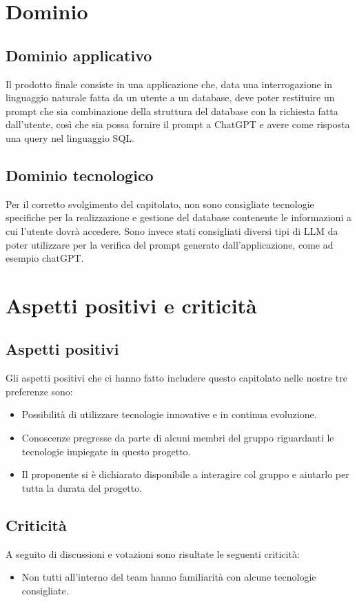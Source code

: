 \documentclass[12pt]{report}
\begin{document}
\section{Dominio}
\subsection{Dominio applicativo}
Il prodotto finale consiste in una applicazione che, data una interrogazione in linguaggio naturale fatta da un utente a un database, deve poter restituire un prompt che sia combinazione della struttura del database con la richiesta fatta dall’utente, così che sia possa fornire il prompt a ChatGPT e avere come risposta una query nel linguaggio SQL.

\subsection{Dominio tecnologico}
Per il corretto svolgimento del capitolato, non sono consigliate tecnologie specifiche per la realizzazione e gestione del database contenente le informazioni a cui l'utente dovrà accedere.
Sono invece stati consigliati diversi tipi di LLM da poter utilizzare per la verifica del prompt generato dall’applicazione, come ad esempio chatGPT.


\section{Aspetti positivi e criticità}
\subsection{Aspetti positivi}
Gli aspetti positivi che ci hanno fatto includere questo capitolato nelle nostre tre preferenze sono:
\begin{itemize}
    \item Possibilità di utilizzare tecnologie innovative e in continua evoluzione.
    \item Conoscenze pregresse da parte di alcuni membri del gruppo riguardanti le tecnologie impiegate in questo progetto.
    \item Il proponente si è dichiarato disponibile a interagire col gruppo e aiutarlo per tutta la durata del progetto.
\end{itemize}

\subsection{Criticità}
A seguito di discussioni e votazioni sono risultate le seguenti criticità:
\begin{itemize}
    \item Non tutti all’interno del team hanno familiarità con alcune tecnologie consigliate.
\end{itemize}
\end{document}

